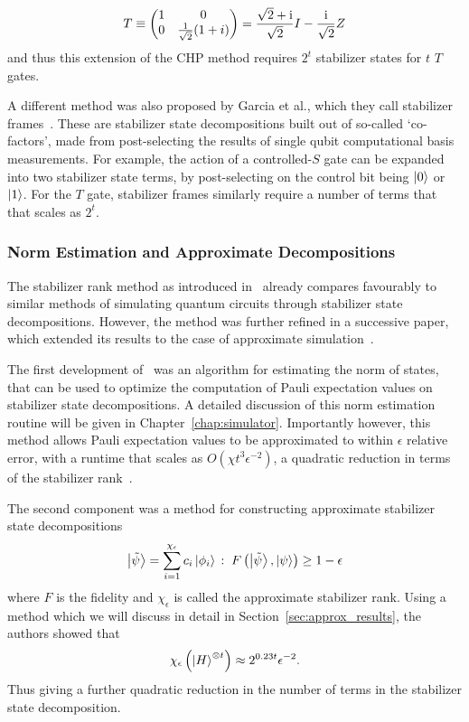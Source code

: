 \[T\equiv \begin{pmatrix}1 & 0 \\ 0 & \frac{1}{\sqrt{2}}(1+i)\end{pmatrix} = \frac{\sqrt{2}+\mathrm{i}}{\sqrt{2}}I-\frac{\mathrm{i}}{\sqrt{2}}Z \]
and thus this extension of the CHP method requires $2^{t}$ stabilizer states for $t$ $T$ gates.\par
A different method was also proposed by Garcia et al., which they call stabilizer frames~\cite{Garcia2015}. These are stabilizer state decompositions built out of so-called `co-factors', made from post-selecting the results of single qubit computational basis measurements. For example, the action of a controlled-$S$ gate can be expanded into two stabilizer state terms, by post-selecting on the control bit being $\ket{0}$ or $\ket{1}$. For the $T$ gate, stabilizer frames similarly require a number of terms that that scales as $2^{t}$.
\subsubsection{Norm Estimation and Approximate Decompositions}
The stabilizer rank method as introduced in~\cite{Bravyi2015} already compares favourably to similar methods of simulating quantum circuits through stabilizer state decompositions. However, the method was further refined in a successive paper, which extended its results to the case of approximate simulation~\cite{Bravyi2016}.\par
The first development of~\cite{Bravyi2016} was an algorithm for estimating the norm of states, that can be used to optimize the computation of Pauli expectation values on stabilizer state decompositions. A detailed discussion of this norm estimation routine will be given in Chapter~\ref{chap:simulator}. Importantly however, this method allows Pauli expectation values to be approximated to within $\epsilon$ relative error, with a runtime that scales as $O(\chi t^{3}\epsilon^{-2})$, a quadratic reduction in terms of the stabilizer rank~\cite{Bravyi2016}.\par
The second component was a method for constructing approximate stabilizer state decompositions
\begin{equation}
\ket{\tilde{\psi}}=\sum_{i=1}^{\chi_{\epsilon}}c_{i}\ket{\phi_{i}}\,:\;F\left(\ket{\tilde{\psi}},\ket{\psi}\right)\geq1-\epsilon
\label{eq:old_approx_rank}
\end{equation}
where $F$ is the fidelity and $\chi_{\epsilon}$ is called the approximate stabilizer rank. Using a method which we will discuss in detail in Section~\ref{sec:approx_results}, the authors showed that
\begin{equation}
\chi_{\epsilon}\left(\ket{H}^{\otimes t}\right)\approx 2^{0.23t}\epsilon^{-2}.
\label{eq:approx_t_rank}
\end{equation}
Thus giving a further quadratic reduction in the number of terms in the stabilizer state decomposition.\par
